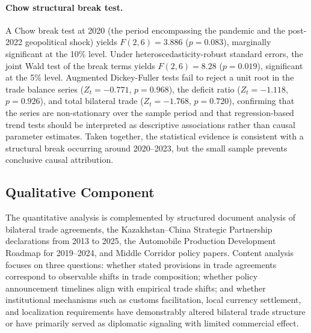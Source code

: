 \documentclass[12pt]{article}
\begin{document}
\paragraph{Chow structural break test.} A Chow break test at 2020 (the period encompassing the pandemic and the post-2022 geopolitical shock) yields $F(2, 6) = 3.886$ ($p = 0.083$), marginally significant at the 10\% level. Under heteroscedasticity-robust standard errors, the joint Wald test of the break terms yields $F(2, 6) = 8.28$ ($p = 0.019$), significant at the 5\% level. Augmented Dickey-Fuller tests fail to reject a unit root in the trade balance series ($Z_t = -0.771$, $p = 0.968$), the deficit ratio ($Z_t = -1.118$, $p = 0.926$), and total bilateral trade ($Z_t = -1.768$, $p = 0.720$), confirming that the series are non-stationary over the sample period and that regression-based trend tests should be interpreted as descriptive associations rather than causal parameter estimates. Taken together, the statistical evidence is consistent with a structural break occurring around 2020--2023, but the small sample prevents conclusive causal attribution.

\subsection{Qualitative Component}

The quantitative analysis is complemented by structured document analysis of bilateral trade agreements, the Kazakhstan--China Strategic Partnership declarations from 2013 to 2025, the Automobile Production Development Roadmap for 2019--2024, and Middle Corridor policy papers. Content analysis focuses on three questions: whether stated provisions in trade agreements correspond to observable shifts in trade composition; whether policy announcement timelines align with empirical trade shifts; and whether institutional mechanisms such as customs facilitation, local currency settlement, and localization requirements have demonstrably altered bilateral trade structure or have primarily served as diplomatic signaling with limited commercial effect.
\end{document}
